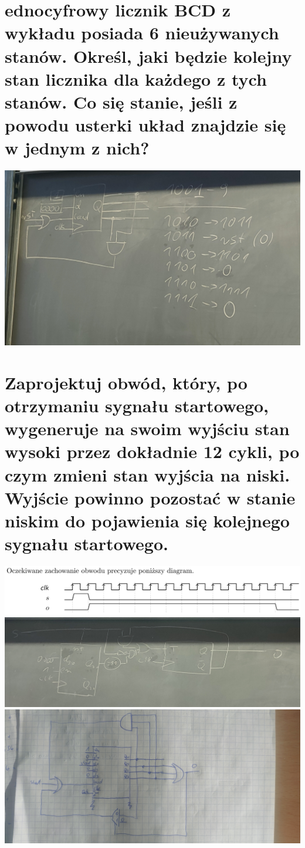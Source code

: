 \documentclass{article}
\begin{document}
\section{ednocyfrowy licznik BCD z wykładu posiada 6 nieużywanych stanów. Określ, jaki będzie kolejny stan licznika dla każdego z tych stanów. Co się stanie, jeśli z powodu usterki układ znajdzie się w jednym z nich?}
\begin{center}
\includegraphics[scale=0.2]{./L07Z05.jpg}
\end{center}
\section{Zaprojektuj obwód, który, po otrzymaniu sygnału startowego, wygeneruje na swoim wyjściu stan wysoki przez dokładnie 12 cykli, po czym zmieni stan wyjścia na niski. Wyjście powinno pozostać w stanie niskim do pojawienia się kolejnego sygnału startowego.}
\begin{center}
\includegraphics[scale=0.3]{./L07Z06.png}
\\
\includegraphics[scale=0.1]{./L07Z06v1.jpg}
\\
\includegraphics[scale=0.05]{./L07Z06v2.jpg}
\end{center}
\end{document}
